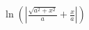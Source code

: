 \documentclass[preview]{standalone}
\begin{document}
\begin{align*}
\ln(|\frac{\sqrt{a^2+x^2}}{a}+\frac{x}{a}|)
\end{align*}
\end{document}
